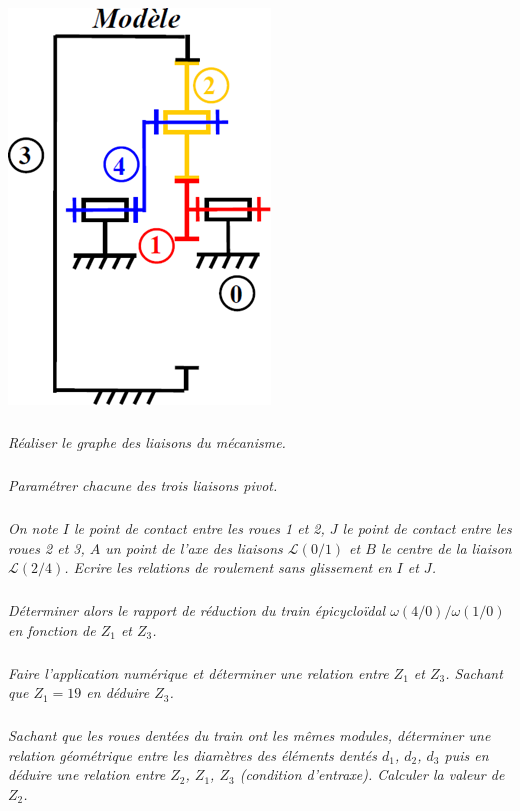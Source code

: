 \documentclass[10pt,oneside]{article}
\begin{document}
\begin{minipage}[c]{.32\linewidth}
\begin{center}
 \includegraphics[width=.85\textwidth]{png/secateur3}
\end{center}
\end{minipage} \hfill
\begin{minipage}[c]{.55\linewidth}


\subparagraph{}
\textit{Réaliser le graphe des liaisons du mécanisme.}

\subparagraph{}
\textit{Paramétrer chacune des trois liaisons pivot.}

\subparagraph{}
\textit{On note $I$ le point de contact entre les roues 1 et 2, $J$ le point de contact entre les roues 2 et 3, $A$ un point de l'axe des liaisons $\mathcal{L}(0/1)$ et $B$ le centre de la liaison $\mathcal{L}(2/4)$. Ecrire les relations de roulement sans glissement en $I$ et $J$.}

\subparagraph{}
\textit{Déterminer alors le rapport de réduction du train épicycloïdal $\omega(4/0)/\omega(1/0)$ en fonction de $Z_1$ et $Z_3$.}

\end{minipage}

\subparagraph{}
\textit{Faire l’application numérique et déterminer une relation entre $Z_1$ et $Z_3$. Sachant que $Z_1=19$ en déduire $Z_3$.}

\subparagraph{}
\textit{Sachant que les roues dentées du train ont les mêmes modules, déterminer une relation géométrique entre les diamètres des éléments dentés $d_1$, $d_2$, $d_3$ puis en déduire une relation entre $Z_2$, $Z_1$, $Z_3$ (condition d’entraxe). Calculer la valeur de $Z_2$.}
\end{document}

